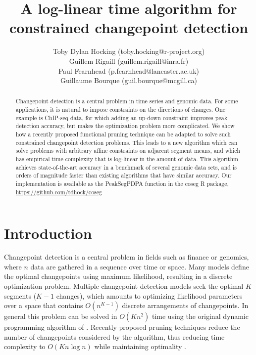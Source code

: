 \documentclass{article}
\begin{document}
\title{A log-linear time algorithm for constrained changepoint detection}
\author{
Toby Dylan Hocking (toby.hocking@r-project.org)\\
Guillem Rigaill (guillem.rigaill@inra.fr)\\
Paul Fearnhead (p.fearnhead@lancaster.ac.uk)\\
Guillaume Bourque (guil.bourque@mcgill.ca)
}
\maketitle

\begin{abstract}
  Changepoint detection is a central problem in time series and
  genomic data. For some applications, it is natural to impose
  constraints on the directions of changes. One example is ChIP-seq
  data, for which adding an up-down constraint improves peak detection
  accuracy, but makes the optimization problem more complicated. We
  show how a recently proposed functional pruning technique can be
  adapted to solve such constrained changepoint detection
  problems. This leads to a new algorithm which can solve problems
  with arbitrary affine constraints on adjacent segment means, and
  which has empirical time complexity that is log-linear in the amount
  of data. This algorithm achieves state-of-the-art accuracy in a
  benchmark of several genomic data sets, and is orders of magnitude
  faster than existing algorithms that have similar accuracy. Our
  implementation is available as the PeakSegPDPA function in the coseg
  R package, \url{https://github.com/tdhock/coseg}
\end{abstract}

\newpage

\tableofcontents

\newpage

\section{Introduction}

Changepoint detection is a central problem in fields such as finance
or genomics, where $n$ data are gathered in a sequence over time or
space. Many models define the optimal changepoints using maximum
likelihood, resulting in a discrete optimization problem. Multiple
changepoint detection models seek the optimal $K$ segments
($K-1$ changes), which amounts to optimizing likelihood
parameters over a space that contains $O(n^{K-1})$ discrete
arrangements of changepoints. In general this problem can be solved
in $O(Kn^2)$ time using the original dynamic programming algorithm of
\citet{segment-neighborhood}. Recently proposed pruning techniques
reduce the number of changepoints considered by the algorithm, thus
reducing time complexity to $O(K n\log n)$ while maintaining
optimality \citep{pruned-dp, johnson, fpop}.
\end{document}
